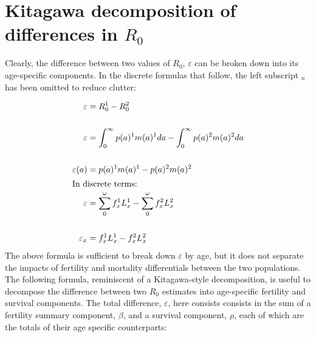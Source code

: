 \documentclass{article}
\begin{document}
\section*{Kitagawa decomposition of differences in $R_{0}$}
Clearly, the difference between two values of $R_{0}$, $\varepsilon$ can be broken down into its age-specific components. In the discrete formulas that follow, the left subscript ${}_n$ has been omitted to reduce clutter:

\begin{align}
	\varepsilon   				&= R_{0}^{1} - R_{0}^{2}\notag \\ \notag \\
	\varepsilon   				&= \int_{0}^{\infty}p(a)^{1}m(a)^{1}da - \int_{0}^{\infty}p(a)^{2}m(a)^{2}da \notag \\ \notag \\
	\varepsilon(a) 				&= p(a)^{1}m(a)^{1} - p(a)^{2}m(a)^{2} \notag \\
	\intertext{In discrete terms:}
	\varepsilon   				&= \sum_{0}^{\omega} f _{x}^{1} L _{x}^{1} - \sum_{0}^{\omega} f _{x}^{2} L _{x}^{2} \notag \\ \notag \\
	\varepsilon _{x} 			&= f_{x}^{1}  L _{x}^{1} - f _{x}^{2} L _{x}^{2}\label{eq2}
\end{align}
The above formula is sufficient to break down $\varepsilon$ by age, but it does not separate the impacts of fertility and mortality differentials between the two populations. The following formula, reminiscent of a Kitagawa-style decomposition\citep{kltagawa1955components}, is useful to decompose the difference between two $R_{0}$ estimates into age-specific fertility and survival components. The total difference, $\varepsilon$, here consists consists in the sum of a fertility summary component, $\beta$, and a survival component, $\rho$, each of which are the totals of their age specific counterparts:
\end{document}

